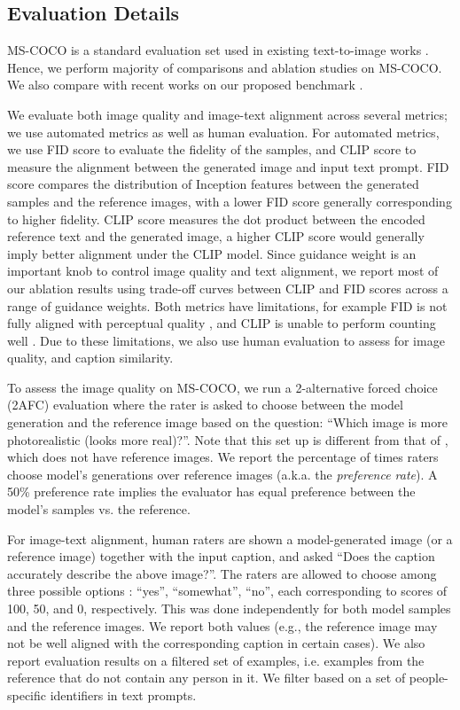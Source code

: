 \subsection{Evaluation Details}
\label{sec:experiments_evaluationdetails}

MS-COCO is a standard evaluation set used in existing text-to-image works \cite{ramesh-dalle,xu-cvpr-2018,nichol-glide}. Hence, we perform majority of comparisons and ablation studies on MS-COCO. We also compare \name with recent works \cite{ramesh-dalle2, crowson2022vqgan, rombach-cvpr-2022} on our proposed benchmark \benchmarkname.

We evaluate both image quality and image-text alignment across several metrics; we use automated metrics as well as human evaluation. For automated metrics, we use FID score \cite{heusel2017gans} to evaluate the fidelity of the samples, and CLIP score \cite{hessel2021clipscore, radford2021learning} to measure the alignment between the generated image and input text prompt. FID score compares the distribution of Inception features between the generated samples and the reference images, with a lower FID score generally corresponding to higher fidelity. CLIP score measures the dot product between the encoded reference text and the generated image, a higher CLIP score would generally imply better alignment under the CLIP model. Since guidance weight is an important knob to control image quality and text alignment, we report most of our ablation results using trade-off curves between CLIP and FID scores across a range of guidance weights. Both metrics have limitations, for example FID is not fully aligned with perceptual quality \cite{parmar-cvpr-2022}, and CLIP is unable to perform counting well \cite{radford2021learning}. Due to these limitations, we also use human evaluation to assess for image quality, and caption similarity. 

To assess the image quality on MS-COCO, we run a 2-alternative forced choice (2AFC) evaluation where the rater is asked to choose between the model generation and the reference image based on the question: ``Which image is more photorealistic (looks more real)?''. Note that this set up is different from that of \benchmarkname, which does not have reference images. We report the percentage of times raters choose model's generations over reference images (a.k.a. the \emph{preference rate}). A 50\% preference rate implies the evaluator has equal preference between the model's samples vs. the reference.

For image-text alignment, human raters are shown a model-generated image (or a reference image) together with the input caption, and asked ``Does the caption accurately describe the above image?''. The raters are allowed to choose among three possible options : ``yes'', ``somewhat'', ``no'', each corresponding to scores of 100, 50, and 0, respectively. This was done independently for both model samples and the reference images. We report both values (e.g., the reference image may not be well aligned with the corresponding caption in certain cases). We also report evaluation results on a filtered set of examples, i.e. examples from the reference that do not contain any person in it. We filter based on a set of people-specific identifiers in text prompts.

